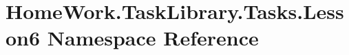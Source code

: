 \hypertarget{namespace_home_work_1_1_task_library_1_1_tasks_1_1_lesson6}{}\section{Home\+Work.\+Task\+Library.\+Tasks.\+Lesson6 Namespace Reference}
\label{namespace_home_work_1_1_task_library_1_1_tasks_1_1_lesson6}

